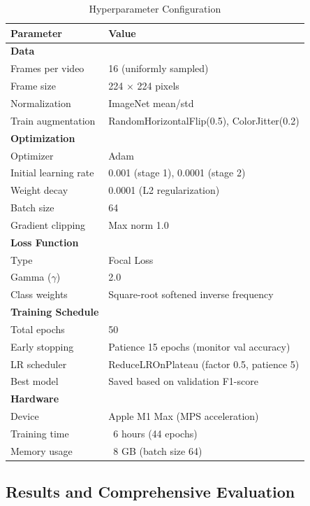 \documentclass[11pt,a4paper]{article}
\begin{document}
\begin{table}[H]
\centering
\caption{Hyperparameter Configuration}
\begin{tabular}{ll}
\toprule
Parameter & Value \\
\midrule
\textbf{Data} & \\
\quad Frames per video & 16 (uniformly sampled) \\
\quad Frame size & 224 $\times$ 224 pixels \\
\quad Normalization & ImageNet mean/std \\
\quad Train augmentation & RandomHorizontalFlip(0.5), ColorJitter(0.2) \\
\midrule
\textbf{Optimization} & \\
\quad Optimizer & Adam \\
\quad Initial learning rate & 0.001 (stage 1), 0.0001 (stage 2) \\
\quad Weight decay & 0.0001 (L2 regularization) \\
\quad Batch size & 64 \\
\quad Gradient clipping & Max norm 1.0 \\
\midrule
\textbf{Loss Function} & \\
\quad Type & Focal Loss \\
\quad Gamma ($\gamma$) & 2.0 \\
\quad Class weights & Square-root softened inverse frequency \\
\midrule
\textbf{Training Schedule} & \\
\quad Total epochs & 50 \\
\quad Early stopping & Patience 15 epochs (monitor val accuracy) \\
\quad LR scheduler & ReduceLROnPlateau (factor 0.5, patience 5) \\
\quad Best model & Saved based on validation F1-score \\
\midrule
\textbf{Hardware} & \\
\quad Device & Apple M1 Max (MPS acceleration) \\
\quad Training time & ~6 hours (44 epochs) \\
\quad Memory usage & ~8 GB (batch size 64) \\
\bottomrule
\end{tabular}
\end{table}

\subsection{Results and Comprehensive Evaluation}
\end{document}
